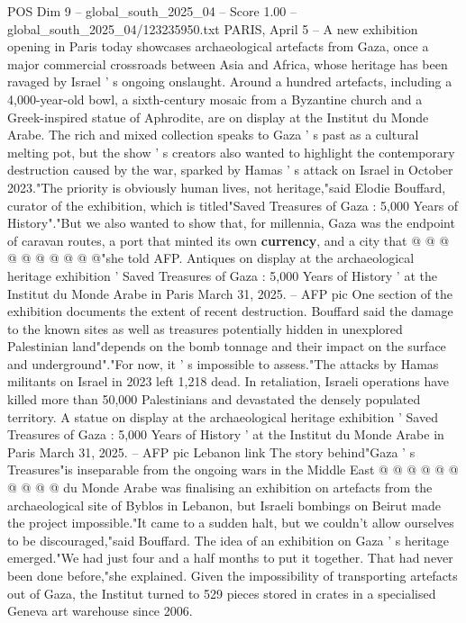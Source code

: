 \begin{textsample}{POS Dim 9 – global\_south\_2025\_04 – Score 1.00 – global\_south\_2025\_04/123235950.txt}  \label{ex:f9_pos_148}
PARIS, April 5 -- A new exhibition opening in Paris today showcases archaeological artefacts from Gaza, once a major commercial crossroads between Asia and Africa, whose heritage has been ravaged by Israel ' s ongoing onslaught.
Around a hundred artefacts, including a 4,000-year-old bowl, a sixth-century mosaic from a Byzantine church and a Greek-inspired statue of Aphrodite, are on display at the Institut du Monde Arabe.
The rich and mixed collection speaks to Gaza ' s past as a cultural melting pot, but the show ' s creators also wanted to highlight the contemporary destruction caused by the war, sparked by Hamas ' s attack on Israel in October 2023."The priority is obviously human lives, not heritage,"said Elodie Bouffard, curator of the exhibition, which is titled"Saved Treasures of Gaza : 5,000 Years of History"."But we also wanted to show that, for millennia, Gaza was the endpoint of caravan routes, a port that minted its own \textbf{currency}, and a city that @ @ @ @ @ @ @ @ @ @"she told AFP.
Antiques on display at the archaeological heritage exhibition ' Saved Treasures of Gaza : 5,000 Years of History ' at the Institut du Monde Arabe in Paris March 31, 2025. -- AFP pic One section of the exhibition documents the extent of recent destruction.
Bouffard said the damage to the known sites as well as treasures potentially hidden in unexplored Palestinian land"depends on the bomb tonnage and their impact on the surface and underground"."For now, it ' s impossible to assess."The attacks by Hamas militants on Israel in 2023 left 1,218 dead.
In retaliation, Israeli operations have killed more than 50,000 Palestinians and devastated the densely populated territory.
A statue on display at the archaeological heritage exhibition ' Saved Treasures of Gaza : 5,000 Years of History ' at the Institut du Monde Arabe in Paris March 31, 2025. -- AFP pic Lebanon link The story behind"Gaza ' s Treasures"is inseparable from the ongoing wars in the Middle East @ @ @ @ @ @ @ @ @ @ du Monde Arabe was finalising an exhibition on artefacts from the archaeological site of Byblos in Lebanon, but Israeli bombings on Beirut made the project impossible."It came to a sudden halt, but we couldn't allow ourselves to be discouraged,"said Bouffard.
The idea of an exhibition on Gaza ' s heritage emerged."We had just four and a half months to put it together.
That had never been done before,"she explained.
Given the impossibility of transporting artefacts out of Gaza, the Institut turned to 529 pieces stored in crates in a specialised Geneva art warehouse since 2006.

\end{textsample}
